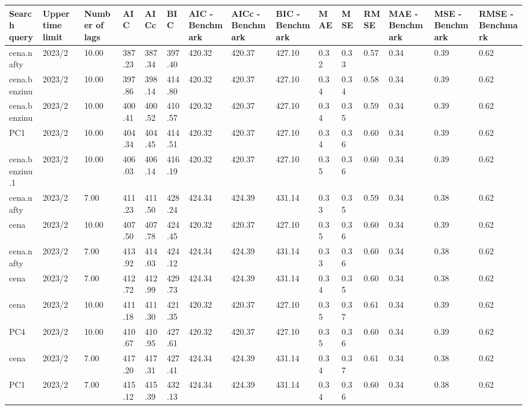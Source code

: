 \begin{longtable}{p{1.5cm}p{1.0cm}p{1.5cm}p{1.0cm}p{1.0cm}p{1.0cm}p{1.0cm}p{1.0cm}p{1.0cm}p{1.0cm}p{1.0cm}p{1.0cm}p{1.0cm}p{1.0cm}p{1.0cm}}
  \hline
Search query & Upper time limit & Number of lags & AIC & AICc & BIC & AIC - Benchmark & AICc - Benchmark & BIC - Benchmark & MAE & MSE & RMSE & MAE - Benchmark & MSE - Benchmark & RMSE - Benchmark \\ 
  \hline
cena.nafty & 2023/2 & 10.00 & 387.23 & 387.34 & 397.40 & 420.32 & 420.37 & 427.10 & 0.32 & 0.33 & 0.57 & 0.34 & 0.39 & 0.62 \\ 
  cena.benzinu & 2023/2 & 10.00 & 397.86 & 398.14 & 414.80 & 420.32 & 420.37 & 427.10 & 0.34 & 0.34 & 0.58 & 0.34 & 0.39 & 0.62 \\ 
  cena.benzinu & 2023/2 & 10.00 & 400.41 & 400.52 & 410.57 & 420.32 & 420.37 & 427.10 & 0.34 & 0.35 & 0.59 & 0.34 & 0.39 & 0.62 \\ 
  PC1 & 2023/2 & 10.00 & 404.34 & 404.45 & 414.51 & 420.32 & 420.37 & 427.10 & 0.34 & 0.36 & 0.60 & 0.34 & 0.39 & 0.62 \\ 
  cena.benzinu.1 & 2023/2 & 10.00 & 406.03 & 406.14 & 416.19 & 420.32 & 420.37 & 427.10 & 0.35 & 0.36 & 0.60 & 0.34 & 0.39 & 0.62 \\ 
  cena.nafty & 2023/2 & 7.00 & 411.23 & 411.50 & 428.24 & 424.34 & 424.39 & 431.14 & 0.33 & 0.35 & 0.59 & 0.34 & 0.38 & 0.62 \\ 
  cena & 2023/2 & 10.00 & 407.50 & 407.78 & 424.45 & 420.32 & 420.37 & 427.10 & 0.35 & 0.36 & 0.60 & 0.34 & 0.39 & 0.62 \\ 
  cena.nafty & 2023/2 & 7.00 & 413.92 & 414.03 & 424.12 & 424.34 & 424.39 & 431.14 & 0.33 & 0.36 & 0.60 & 0.34 & 0.38 & 0.62 \\ 
  cena & 2023/2 & 7.00 & 412.72 & 412.99 & 429.73 & 424.34 & 424.39 & 431.14 & 0.34 & 0.35 & 0.60 & 0.34 & 0.38 & 0.62 \\ 
  cena & 2023/2 & 10.00 & 411.18 & 411.30 & 421.35 & 420.32 & 420.37 & 427.10 & 0.35 & 0.37 & 0.61 & 0.34 & 0.39 & 0.62 \\ 
  PC4 & 2023/2 & 10.00 & 410.67 & 410.95 & 427.61 & 420.32 & 420.37 & 427.10 & 0.35 & 0.36 & 0.60 & 0.34 & 0.39 & 0.62 \\ 
  cena & 2023/2 & 7.00 & 417.20 & 417.31 & 427.41 & 424.34 & 424.39 & 431.14 & 0.34 & 0.37 & 0.61 & 0.34 & 0.38 & 0.62 \\ 
  PC1 & 2023/2 & 7.00 & 415.12 & 415.39 & 432.13 & 424.34 & 424.39 & 431.14 & 0.34 & 0.36 & 0.60 & 0.34 & 0.38 & 0.62 \\ 

\end{longtable}

